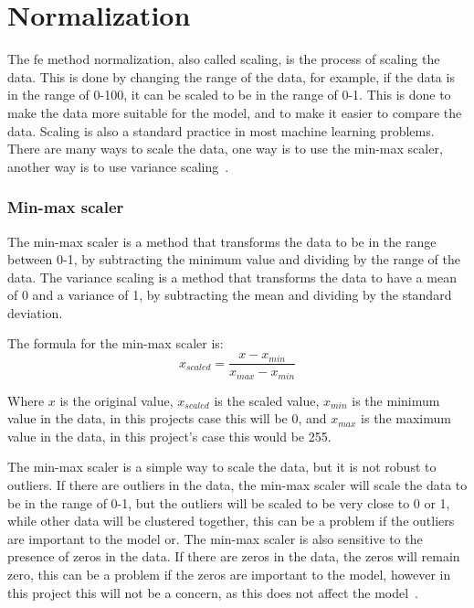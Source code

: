 \section{Normalization}\label{sec:normalization}
The \gls{fe} method normalization, also called scaling, is the process of scaling the data. This is done by changing the range of the data, for example, if the data is in the range of 0-100, it can be scaled to be in the range of 0-1. This is done to make the data more suitable for the model, and to make it easier to compare the data. Scaling is also a standard practice in most machine learning problems. There are many ways to scale the data, one way is to use the min-max scaler, another way is to use variance scaling~\cite{Feature-engineering-zheng}. 
\subsubsection{Min-max scaler}\label{subsec:min-max}
The min-max scaler is a method that transforms the data to be in the range between 0-1, by subtracting the minimum value and dividing by the range of the data. The variance scaling is a method that transforms the data to have a mean of 0 and a variance of 1, by subtracting the mean and dividing by the standard deviation.

The formula for the min-max scaler is:
\begin{equation}
    x_{scaled} = \frac{x - x_{min}}{x_{max} - x_{min}}
\end{equation}

Where $x$ is the original value, $x_{scaled}$ is the scaled value, $x_{min}$ is the minimum value in the data, in this projects case this will be 0, and $x_{max}$ is the maximum value in the data, in this project's case this would be 255. 

The min-max scaler is a simple way to scale the data, but it is not robust to outliers. If there are outliers in the data, the min-max scaler will scale the data to be in the range of 0-1, but the outliers will be scaled to be very close to 0 or 1, while other data will be clustered together, this can be a problem if the outliers are important to the model or. The min-max scaler is also sensitive to the presence of zeros in the data. If there are zeros in the data, the zeros will remain zero, this can be a problem if the zeros are important to the model, however in this project this will not be a concern, as this does not affect the model~\cite{Feature-engineering-zheng}. 
